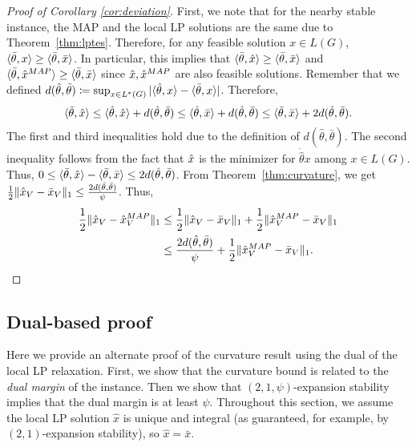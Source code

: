 \deviation*
\begin{proof}[Proof of Corollary \ref{cor:deviation}]
First, we note that for the nearby stable instance, the MAP and the local LP solutions are the same due to Theorem~\ref{thm:lptes}. Therefore, for any feasible solution $x \in L(G)$, $ \langle \bar{\theta},x\rangle \ge \langle \bar{\theta},\bar{x}\rangle$. In particular, this implies that $\langle \bar{\theta},\hat{x}\rangle \ge \langle \bar{\theta},\bar{x}\rangle$ and $\langle \bar{\theta},\hat{x}^{MAP}\rangle \ge \langle \bar{\theta},\bar{x}\rangle$ since $\hat{x}, \hat{x}^{MAP}$ are also feasible solutions. Remember that we defined $d(\hat{\theta},\bar{\theta}) \coloneqq \sup_{x \in L^*(G)} | \langle \hat{\theta},x\rangle  - \langle \bar{\theta},x\rangle|$. Therefore,
\[ \langle \bar{\theta},\hat{x}\rangle \leq \langle \hat{\theta},\hat{x}\rangle + d(\hat{\theta},\bar{\theta}) \leq \langle \hat{\theta},\bar{x}\rangle + d(\hat{\theta},\bar{\theta}) \leq \langle \bar{\theta},\bar{x}\rangle + 2d(\hat{\theta},\bar{\theta}). \]
The first and third inequalities hold due to the definition of $d(\hat{\theta},\bar{\theta})$. The second inequality follows from the fact that $\hat{x}$ is the minimizer for $\dot{\hat{\theta}}{x}$ among $x \in L(G)$. Thus, $0 \leq \langle \bar{\theta},\hat{x}\rangle - \langle \bar{\theta},\bar{x}\rangle \leq 2d(\hat{\theta},\bar{\theta})$. From Theorem~\ref{thm:curvature}, we get
$\frac{1}{2}\lVert \hat{x}_V - \bar{x}_V \rVert_1 \le \frac{2d(\hat{\theta},\bar{\theta})}{\psi}$. Thus,
\begin{align*}
    \frac{1}{2}\lVert \hat{x}_V - \hat{x}_V^{MAP} \rVert_1 &\leq \frac{1}{2}\lVert \hat{x}_V - \bar{x}_V \rVert_1 + \frac{1}{2}\lVert \hat{x}_V^{MAP} - \bar{x}_V \rVert_1 \\&\leq \frac{2d(\hat\theta,\bar{\theta})}{\psi} + \frac{1}{2}\lVert \hat{x}_V^{MAP} - \bar{x}_V \rVert_1. 
\end{align*}
\end{proof}

\subsection{Dual-based proof}%
Here we provide an alternate proof of the curvature result using the dual of the local LP relaxation.
First, we show that the curvature bound is related to the \emph{dual margin} of the instance. 
Then we show that $(2,1,\psi)$-expansion stability implies that the dual margin is at least $\psi$.
Throughout this section, we assume the local LP solution $\hat{x}$ is unique and integral (as guaranteed, for example, by $(2,1)$-expansion stability), so $\hat{x} = \bar{x}$.

